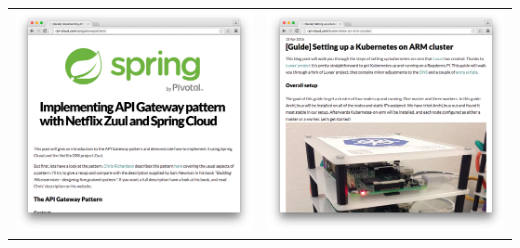 \newpage
\noindent\begin{tabular}{p{7cm}p{7cm}}
\centering
\includegraphics[align=t,width=7cm]{figures/blog/blog2} & \includegraphics[align=t,width=7cm]{figures/blog/blog3} \\  

\end{tabular}